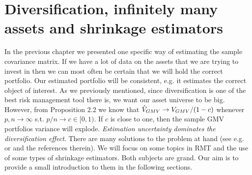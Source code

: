 \documentclass[oneside]{book}\usepackage{knitr}
\begin{document}
\chapter[Diversification \& shrinkage]{Diversification, infinitely many assets and shrinkage estimators}\label{ch:highdim}


In the previous chapter we presented one specific way of estimating the sample covariance matrix.
If we have a lot of data on the assets that we are trying to invest in then we can most often be certain that we will hold the correct portfolio.
Our estimated portfolio will be consistent, e.g. it estimates the correct object of interest. 
As we previously mentioned, since diversification is one of the best risk management tool there is, we want our asset universe to be big.
However, from \citet{bodnar2016optimal} Proposition 2.2 we know that $\hat{V}_{GMV} \rightarrow V_{GMV}/(1-c)$ whenever $p,n \rightarrow \infty$ s.t. $p/n \rightarrow c \in [0,1)$. 
If $c$ is close to one, then the sample GMV portfolios variance will explode. 
\textit{Estimation uncertainty dominates the diversification effect}. 
There are many solutions to the problem at hand (see e.g. \citet{lw17} or \citet{bodnar2021recent} and the references therein). 
We will focus on some topics in RMT and the use of some types of shrinkage estimators. 
Both subjects are grand. 
Our aim is to provide a small introduction to them in the following sections.
\end{document}
